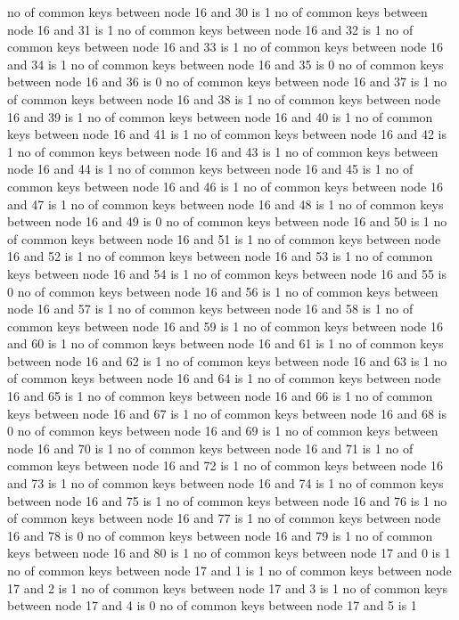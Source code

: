 no of common keys between node 16 and 30 is 1
no of common keys between node 16 and 31 is 1
no of common keys between node 16 and 32 is 1
no of common keys between node 16 and 33 is 1
no of common keys between node 16 and 34 is 1
no of common keys between node 16 and 35 is 0
no of common keys between node 16 and 36 is 0
no of common keys between node 16 and 37 is 1
no of common keys between node 16 and 38 is 1
no of common keys between node 16 and 39 is 1
no of common keys between node 16 and 40 is 1
no of common keys between node 16 and 41 is 1
no of common keys between node 16 and 42 is 1
no of common keys between node 16 and 43 is 1
no of common keys between node 16 and 44 is 1
no of common keys between node 16 and 45 is 1
no of common keys between node 16 and 46 is 1
no of common keys between node 16 and 47 is 1
no of common keys between node 16 and 48 is 1
no of common keys between node 16 and 49 is 0
no of common keys between node 16 and 50 is 1
no of common keys between node 16 and 51 is 1
no of common keys between node 16 and 52 is 1
no of common keys between node 16 and 53 is 1
no of common keys between node 16 and 54 is 1
no of common keys between node 16 and 55 is 0
no of common keys between node 16 and 56 is 1
no of common keys between node 16 and 57 is 1
no of common keys between node 16 and 58 is 1
no of common keys between node 16 and 59 is 1
no of common keys between node 16 and 60 is 1
no of common keys between node 16 and 61 is 1
no of common keys between node 16 and 62 is 1
no of common keys between node 16 and 63 is 1
no of common keys between node 16 and 64 is 1
no of common keys between node 16 and 65 is 1
no of common keys between node 16 and 66 is 1
no of common keys between node 16 and 67 is 1
no of common keys between node 16 and 68 is 0
no of common keys between node 16 and 69 is 1
no of common keys between node 16 and 70 is 1
no of common keys between node 16 and 71 is 1
no of common keys between node 16 and 72 is 1
no of common keys between node 16 and 73 is 1
no of common keys between node 16 and 74 is 1
no of common keys between node 16 and 75 is 1
no of common keys between node 16 and 76 is 1
no of common keys between node 16 and 77 is 1
no of common keys between node 16 and 78 is 0
no of common keys between node 16 and 79 is 1
no of common keys between node 16 and 80 is 1
no of common keys between node 17 and 0 is 1
no of common keys between node 17 and 1 is 1
no of common keys between node 17 and 2 is 1
no of common keys between node 17 and 3 is 1
no of common keys between node 17 and 4 is 0
no of common keys between node 17 and 5 is 1
